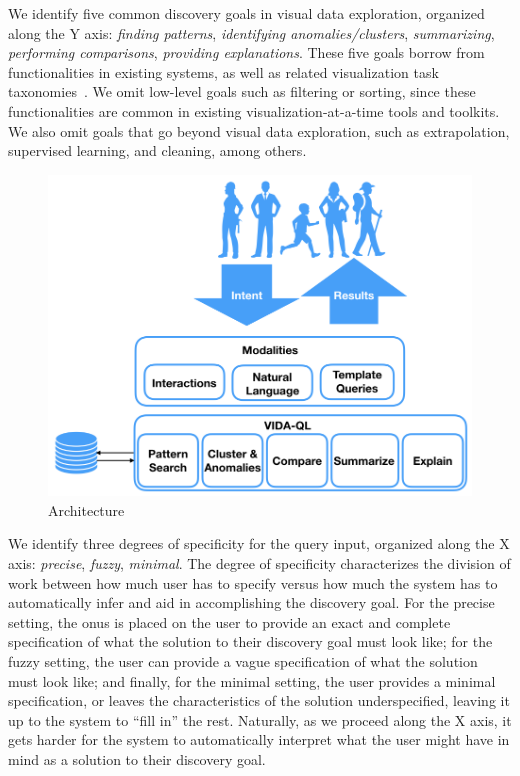 \par
 We identify five 
common discovery goals in visual data exploration, organized
along the Y axis:
{\em finding patterns}, {\em identifying anomalies/clusters}, {\em summarizing}, 
{\em performing comparisons}, {\em providing explanations}.
These five goals borrow from functionalities in existing
systems, as well as related visualization task taxonomies~\cite{Amar2005,Heer2012}.
We omit low-level goals such as filtering or sorting, since these functionalities are common in existing visualization-at-a-time tools and toolkits. We also omit goals that go beyond visual data exploration, such as extrapolation, supervised learning, and cleaning, among others. 

\begin{figure}
\centering
\vspace{-10pt}
\includegraphics[width=\linewidth]{figures/VIDA_architecture.png}
\vspace{-25pt}
\caption{\vida Architecture\label{fig:vida_architecture}
\vspace{-15pt}
}
\end{figure}


\par 
 We identify three degrees of specificity
for the query input, organized along the X axis:
{\em precise}, {\em fuzzy}, {\em minimal}.
The degree of specificity characterizes the division
of work between how much user has to specify
versus how much the system has to automatically
infer and aid in accomplishing the discovery goal. 
For the precise setting, the onus is placed on the user
to provide an exact and complete specification of 
what the solution to their discovery
goal must look like;
for the fuzzy setting, the user can provide
a vague specification of what the solution must look like;
and finally, for the minimal setting,
the user provides a minimal specification, or
leaves the characteristics of the solution underspecified,
leaving it up to the system to ``fill in'' the rest.
Naturally, as we proceed along the X axis,
it gets harder for the system to automatically
interpret what the user might have in mind as a solution
to their discovery goal.


